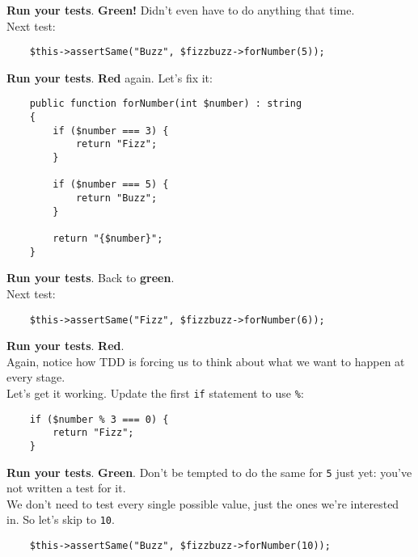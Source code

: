 \textbf{Run your tests}. \textbf{Green!} Didn't even have to do anything that time.
\\

Next test:

\begin{verbatim}
    $this->assertSame("Buzz", $fizzbuzz->forNumber(5));
\end{verbatim}

\textbf{Run your tests}. \textbf{Red} again. Let's fix it:

\begin{verbatim}
    public function forNumber(int $number) : string
    {
        if ($number === 3) {
            return "Fizz";
        }

        if ($number === 5) {
            return "Buzz";
        }

        return "{$number}";
    }
\end{verbatim}

\textbf{Run your tests}. Back to \textbf{green}.
\\

Next test:

\begin{verbatim}
    $this->assertSame("Fizz", $fizzbuzz->forNumber(6));
\end{verbatim}

\textbf{Run your tests}. \textbf{Red}.
\\

Again, notice how TDD is forcing us to think about what we want to happen at every stage.
\\

Let's get it working. Update the first \texttt{if} statement to use \texttt{\%}:

\begin{verbatim}
    if ($number % 3 === 0) {
        return "Fizz";
    }
\end{verbatim}

\textbf{Run your tests}. \textbf{Green}. Don't be tempted to do the same for \texttt{5} just yet: you've not written a test for it.
\\

We don't need to test every single possible value, just the ones we're interested in. So let's skip to \texttt{10}.

\begin{verbatim}
    $this->assertSame("Buzz", $fizzbuzz->forNumber(10));
\end{verbatim}

